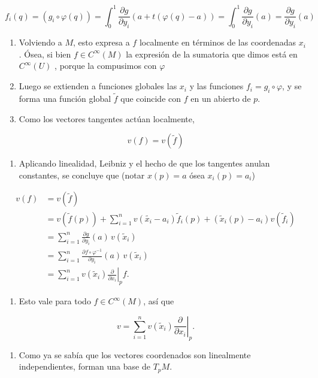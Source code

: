 \begin{bookproof}{}
\[
f_{i}(q)=(g_{i}\circ\varphi(q))=\int_{0}^{1} \frac{\partial g}{\partial y_{i}}(a+t(\varphi(q)-a))=\int_{0}^{1} \frac{\partial g}{\partial y_{i}}(a)=\frac{\partial g}{\partial y_{i}}(a)
\]
\begin{enumerate}[start=8]
\item Volviendo a $M$, esto expresa a $f$ localmente en términos de las coordenadas $x_i$. Ósea, si bien $f\in C^{\infty}(M)$ la expresión de la sumatoria que dimos está en $C^{\infty}(U)$ , porque la compusimos con $\varphi$
\item Luego se extienden a funciones globales las $x_i$ y las funciones $f_{i}=g_i\circ\varphi$, y se forma una función global $\widetilde{f}$ que coincide con $f$ en un abierto de $p$.
\item Como los vectores tangentes actúan localmente,
\end{enumerate}
\[
v(f)=v(\widetilde{f})
\]
\begin{enumerate}[start=11]
\item Aplicando linealidad, Leibniz y el hecho de que los tangentes anulan constantes, se concluye que (notar $x(p)=a$ ósea $x_{i}(p)=a_{i}$)
\end{enumerate}
\[
\begin{aligned}v(f)&=v(\tilde{f})\\&= v(\tilde{f}(p))+\sum^{n}_{i=1}v(\tilde{x_{i}}-a_{i})\tilde{f}_{i}(p)+(\tilde{x}_{i}(p)-a_{i})v(\tilde{f}_{i})\\&=\sum_{i=1}^n \frac{\partial g}{\partial y_i}(a)\,v(\widetilde{x}_i)\\&=\sum_{i=1}^n \frac{\partial f\circ\varphi ^{-1}}{\partial y_i}(a)\,v(\widetilde{x}_i)\\&=\sum_{i=1}^n v(\widetilde{x}_i)\left.\frac{\partial}{\partial x_i}\right|_p f.\end{aligned}
\]
\begin{enumerate}[start=12]
\item Esto vale para todo $f\in C^\infty(M)$, así que
\end{enumerate}
\[
v=\sum_{i=1}^n v(\widetilde{x}_i)\left.\frac{\partial}{\partial x_i}\right|_p.
\]
\begin{enumerate}[start=13]
\item Como ya se sabía que los vectores coordenados son linealmente independientes, forman una base de $T_pM$.
\end{enumerate}
\bookqed
\end{bookproof}

